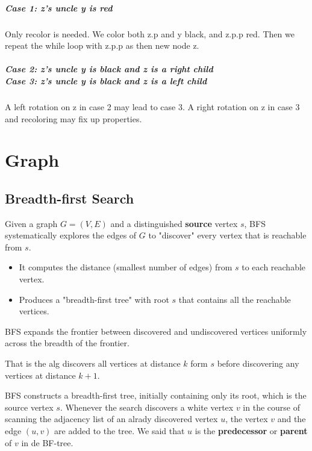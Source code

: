 \documentclass[a4paper,11pt]{book}
\begin{document}
\paragraph{Case 1: z's uncle y is red} Only recolor is needed. We color both z.p and y black, and z.p.p red. Then we repeat the while loop with z.p.p as then new node z.
\paragraph{Case 2: z's uncle y is black and z is a right child \\ Case 3: z's uncle y is black and z is a left child}
A left rotation on z in case 2 may lead to case 3.
A right rotation on z in case 3 and recoloring may fix up properties.
\chapter{Graph}
\section{Breadth-first Search}
Given a graph $G = (V,E)$ and a distinguished \textbf{source} vertex $s$, BFS
systematically explores the edges of $G$ to "discover" every vertex that is
reachable from $s$. 
\begin{itemize}
\item It computes the distance (smallest number of edges) from $s$ to each
reachable vertex.
\item Produces a "breadth-first tree" with root $s$ that contains all the
reachable vertices.
\end{itemize}

BFS expands the frontier between discovered and undiscovered vertices uniformly
across the breadth of the frontier. 

That is the alg discovers all vertices at distance $k$ form $s$ before
discovering any vertices at distance $k+1$.

BFS constructs a breadth-first tree, initially containing only its root, which
is the source vertex $s$. Whenever the search discovers a white vertex $v$ in
the course of scanning the adjacency list of an alrady discovered vertex $u$,
the vertex $v$ and the edge $(u,v)$ are added to the tree. We said that $u$ is
the \textbf{predecessor} or \textbf{parent} of $v$ in de BF-tree.
\end{document}
